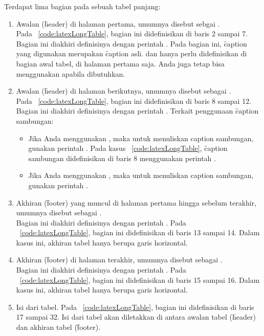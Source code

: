Terdapat lima bagian pada sebuah tabel panjang:
\begin{enumerate}
	\item Awalan (\f{header}) di halaman pertama, umumnya disebut sebgai .\\
	Pada \lst~\ref{code:latexLongTable}, bagian ini didefinisikan di baris 2 sampai 7.
	Bagian ini diakhiri definisinya dengan perintah .
	Pada bagian ini, \f{caption} yang digunakan merupakan \f{caption} asli.
	 dan  hanya perlu didefinisikan di bagian awal tabel, di halaman pertama saja.
	Anda juga tetap bisa menggunakan  apabila dibutuhkan.
	\item Awalan (\f{header}) di halaman berikutnya, umumnya disebut sebagai .\\
	Pada \lst~\ref{code:latexLongTable}, bagian ini didefinisikan di baris 8 sampai 12.
	Bagian ini diakhiri definisinya dengan perintah .
	Terkait penggunaan \f{caption} sambungan:
	\begin{itemize}
		\item Jika Anda menggunakan , maka untuk menuliskan caption sambungan, gunakan perintah .
		Pada kasus \lst~\ref{code:latexLongTable}, \f{caption} sambungan didefinisikan di baris 8 menggunakan perintah .
		\item Jika Anda menggunakan , maka untuk menuliskan caption sambungan, gunakan perintah .
	\end{itemize}
	\item Akhiran (\f{footer}) yang muncul di halaman pertama hingga sebelum terakhir, umumnya disebut sebagai .\\
	Bagian ini diakhiri definisinya dengan perintah .
	Pada \lst~\ref{code:latexLongTable}, bagian ini didefinisikan di baris 13 sampai 14.
	Dalam kasus ini, akhiran tabel hanya berupa garis horizontal.
	\item Akhiran (\f{footer}) di halaman terakhir, umumnya disebut sebagai .\\
	Bagian ini diakhiri definisinya dengan perintah .
	Pada \lst~\ref{code:latexLongTable}, bagian ini didefinisikan di baris 15 sampai 16.
	Dalam kasus ini, akhiran tabel hanya berupa garis horizontal.
	\item Isi dari tabel.
	Pada \lst~\ref{code:latexLongTable}, bagian ini didefinisikan di baris 17 sampai 32.
	Isi dari tabel akan diletakkan di antara awalan tabel (\f{header}) dan akhiran tabel (\f{footer}).
\end{enumerate}

